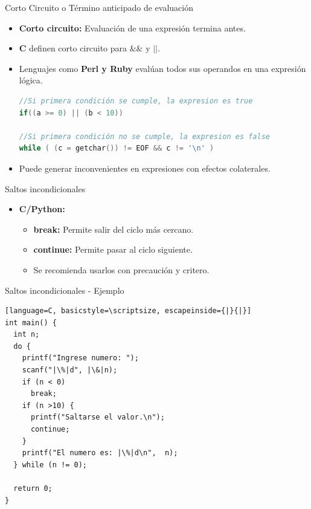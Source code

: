 \documentclass{beamer}
\begin{document}
\begin{frame}[fragile]{Corto Circuito o Término anticipado de evaluación}
\begin{itemize}
	\item \textbf{Corto circuito:} Evaluación de una expresión termina antes.
	\item \textbf{C} definen corto circuito para  $\&\&$ y $||$.
	\item Lenguajes como \textbf{Perl y Ruby} evalúan todos sus operandos en una expresión lógica.
	\begin{lstlisting}[language=C, basicstyle=\scriptsize] 
//Si primera condición se cumple, la expresion es true
if((a >= 0) || (b < 10))

//Si primera condición no se cumple, la expresion es false
while ( (c = getchar()) != EOF && c != '\n' )
	\end{lstlisting}
	\item Puede generar inconvenientes en expresiones con efectos colaterales.  
\end{itemize} 
\end{frame}


\begin{frame}[fragile]{Saltos incondicionales}
\begin{itemize}
	\item \textbf{C/Python:}
	\begin{itemize}
		\item \textbf{break:} Permite salir del ciclo más cercano.
		\item \textbf{continue:} Permite pasar al ciclo siguiente.
		\item Se recomienda usarlos con precaución y critero.  
	\end{itemize}
\end{itemize}
\end{frame}

\begin{frame}[fragile]{Saltos incondicionales - Ejemplo}
\footnotesize
\begin{lstlisting}[language=C, basicstyle=\scriptsize, escapeinside={|}{|}] 
int main() {
  int n;
  do {
    printf("Ingrese numero: ");
    scanf("|\%|d", |\&|n);
    if (n < 0)
      break;
    if (n >10) {
      printf("Saltarse el valor.\n");
      continue;
    }
    printf("El numero es: |\%|d\n",  n);
  } while (n != 0);

  return 0;
}
\end{lstlisting}
\end{frame}
\end{document}
